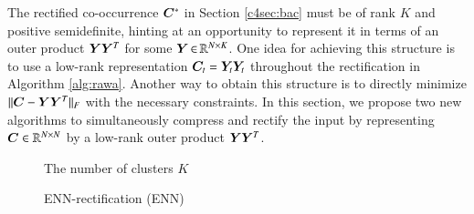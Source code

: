 The rectified co-occurrence $\bm{C}^*$ in Section \ref{c4sec:bac} must be of rank
$K$ and positive semidefinite, hinting at an opportunity to represent it in
terms of an outer product $\bm{Y} \bm{Y}^T$ for some $\bm{Y} \operatorname{\in} \mathbb{R}^{N \mathrel{\times} K}$. One
idea for achieving this structure is to use a low-rank representation $\bm{C}_t =
\bm{Y}_t \bm{Y}_t$ throughout the rectification in Algorithm \ref{alg:rawa}. Another
way to obtain this structure is to directly minimize $\|\bm{C} - \bm{Y} \bm{Y}^T\|_F$
with the necessary constraints. In this section, we propose two new algorithms
to simultaneously compress and rectify the input by representing $\bm{C} \in \mathbb{R}^
{N \mathrel{\times} N}$ by a low-rank outer product $\bm{Y} \bm{Y}^T$.
\begin{figure}[ht]
	\begin{algorithm}[H]
		\DontPrintSemicolon
		\hspace{28px} The number of clusters $K$\\
		\caption{ENN-rectification (ENN)}
	\label{alg:enn}        
	\end{algorithm}
\end{figure}
